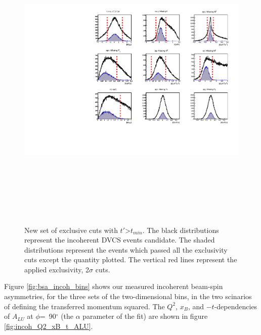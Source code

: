 \documentclass[a4paper,11pt,twoside]{article}
\begin{document}
\begin{figure}[h!]
   \includegraphics[height=15.0cm]{fig/all_incoh_exc_cuts_test.pdf}
   \caption{New set of exclusive cuts with $t'$>$t_{min}$. The black
      distributions represent the incoherent DVCS events candidate. The shaded
      distributions represent the events which passed all the exclusivity cuts
      except the quantity plotted. The vertical red lines represent the applied 
   exclusivity, 2$\sigma$ cuts.}
\label{fig:cuts_tprime}
\end{figure}

Figure \ref{fig:bsa_incoh_bins} shows our measured incoherent beam-spin
asymmetries, for the three sets of the two-dimensional bins, in the two 
scinarios of defining the transferred momentum squared. The $Q^2$, $x_{B}$, and 
$-t$-dependencies of $A_{LU}$ at $\phi$=~90$^{\circ}$ (the $\alpha$ parameter 
of the fit) are shown in figure \ref{fig:incoh_Q2_xB_t_ALU}.
\end{document}
